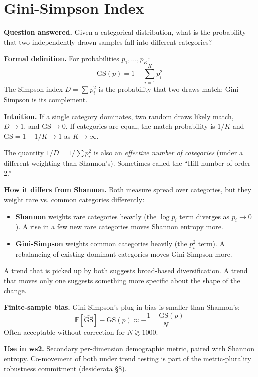 \documentclass[11pt]{article}
\begin{document}
\section{Gini-Simpson Index}
\label{sec:gini-simpson}

\textbf{Question answered.} Given a categorical distribution, what is
the probability that two independently drawn samples fall into different
categories?

\textbf{Formal definition.} For probabilities $p_1, \ldots, p_K$:
\[
  \text{GS}(p) = 1 - \sum_{i=1}^{K} p_i^2
\]
The Simpson index $D = \sum p_i^2$ is the probability that two draws
match; Gini-Simpson is its complement.

\textbf{Intuition.} If a single category dominates, two random draws
likely match, $D \to 1$, and $\text{GS} \to 0$. If categories are
equal, the match probability is $1/K$ and $\text{GS} = 1 - 1/K \to 1$
as $K \to \infty$.

The quantity $1/D = 1/\sum p_i^2$ is also an \textit{effective number
of categories} (under a different weighting than Shannon's).
Sometimes called the ``Hill number of order 2.''

\textbf{How it differs from Shannon.} Both measure spread over
categories, but they weight rare vs. common categories differently:

\begin{itemize}[nosep]
  \item \textbf{Shannon} weights rare categories heavily (the
    $\log p_i$ term diverges as $p_i \to 0$). A rise in a few new rare
    categories moves Shannon entropy more.
  \item \textbf{Gini-Simpson} weights common categories heavily (the
    $p_i^2$ term). A rebalancing of existing dominant categories moves
    Gini-Simpson more.
\end{itemize}

A trend that is picked up by both suggests broad-based diversification.
A trend that moves only one suggests something more specific about the
shape of the change.

\textbf{Finite-sample bias.} Gini-Simpson's plug-in bias is smaller
than Shannon's:
\[
  \mathbb{E}[\widehat{\text{GS}}] - \text{GS}(p) \approx
  -\frac{1 - \text{GS}(p)}{N}
\]
Often acceptable without correction for $N \gtrsim 1000$.

\textbf{Use in ws2.} Secondary per-dimension demographic metric, paired
with Shannon entropy. Co-movement of both under trend testing is part
of the metric-plurality robustness commitment (desiderata §8).
\end{document}
